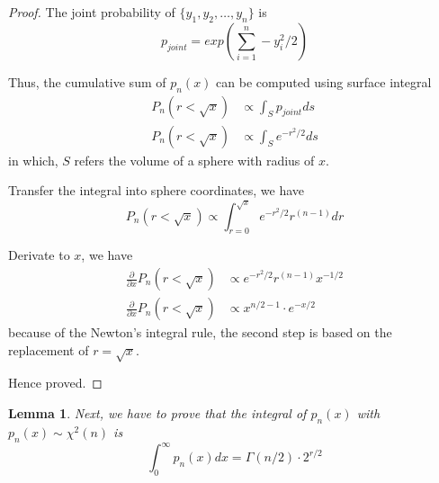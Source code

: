 \documentclass[a4paper]{article}
\newtheorem{lemma}{Lemma}[section]
\begin{document}
\begin{proof}
    The joint probability of $\{y_1, y_2, \dots, y_n\}$ is
    \begin{equation*}
        p_{joint} = exp(\sum_{i=1}^{n}-y_i^2/2)
    \end{equation*}

    Thus, the cumulative sum of $p_n(x)$ can be computed using surface integral
    \begin{equation*}
        \begin{aligned}
            P_n(r<\sqrt{x}) & \propto \int_{S} p_{joint} ds  \\
            P_n(r<\sqrt{x}) & \propto \int_{S} e^{-r^2/2} ds
        \end{aligned}
    \end{equation*}
    in which, $S$ refers the volume of a sphere with radius of $x$.

    Transfer the integral into sphere coordinates, we have
    \begin{equation*}
        P_n(r<\sqrt{x}) \propto \int_{r=0}^{\sqrt{x}} e^{-r^2/2} r^{(n-1)} dr
    \end{equation*}

    Derivate to $x$, we have
    \begin{equation*}
        \begin{aligned}
            \frac{\partial}{\partial{x}} {P_n(r<\sqrt{x})} & \propto e^{-r^2/2} r^{(n-1)} x^{-1/2} \\
            \frac{\partial}{\partial{x}} {P_n(r<\sqrt{x})} & \propto x^{n/2-1} \cdot e^{-x/2}
        \end{aligned}
    \end{equation*}
    because of the Newton's integral rule, the second step is based on the replacement of $r = \sqrt{x}$.

    Hence proved.

\end{proof}

\begin{lemma} \label{lemma: The pdf of Chi-squared distribution is a pdf}
    Next, we have to prove that the integral of $p_n(x)$ with $p_n(x) \sim \chi^2(n)$ is
    \begin{equation*}
        \int_0^\infty p_n(x) dx = \Gamma(n/2) \cdot 2^{r/2}
    \end{equation*}

\end{lemma}
\end{document}
